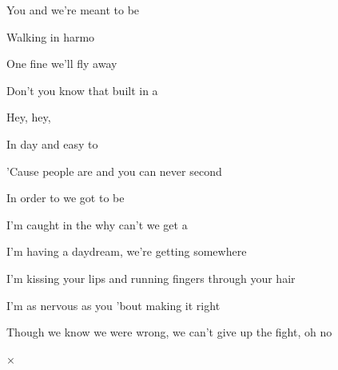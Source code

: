 

\zr
You and  we're meant to be

Walking  in harmo

One fine  we'll fly away

Don't you know that  built in a 

Hey, hey, 
\kr

\zs
In  day and  easy to 

'Cause people are  and you can never second 

In order to  we got to be 

I'm caught in the  why can't we get a 
\ks

\zr\kr

\zs
I'm having a daydream, we're getting somewhere

I'm kissing your lips and running fingers through your hair

I'm as nervous as you 'bout making it right

Though we know we were wrong, we can't give up the fight, oh no
\ks

× \kr

\kp
